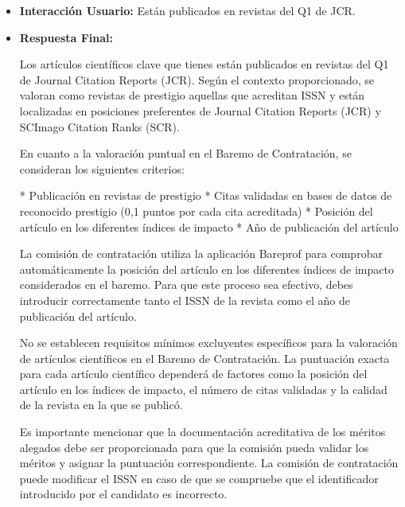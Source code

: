 \documentclass{article}
\begin{document}
\begin{itemize}
\begin{itemize}
                \textbf{Nota importante:}
                * La comisión de contratación puede modificar el ISSN en caso de que se compruebe que el identificador introducido por el candidato es incorrecto.
                * La documentación acreditativa de los méritos alegados debe ser proporcionada por el candidato para que la comisión pueda validar los méritos y asignar la puntuación correspondiente.
          \item \textbf{Interacción Usuario:} Están publicados en revistas del Q1 de JCR.
          \item \textbf{Respuesta Final:}

                Los artículos científicos clave que tienes están publicados en revistas del Q1 de Journal Citation Reports (JCR). Según el contexto proporcionado, se valoran como revistas de prestigio aquellas que acreditan ISSN y están localizadas en posiciones preferentes de Journal Citation Reports (JCR) y SCImago Citation Ranks (SCR).

                En cuanto a la valoración puntual en el Baremo de Contratación, se consideran los siguientes criterios:

                * Publicación en revistas de prestigio
                * Citas validadas en bases de datos de reconocido prestigio (0,1 puntos por cada cita acreditada)
                * Posición del artículo en los diferentes índices de impacto
                * Año de publicación del artículo

                La comisión de contratación utiliza la aplicación Bareprof para comprobar automáticamente la posición del artículo en los diferentes índices de impacto considerados en el baremo. Para que este proceso sea efectivo, debes introducir correctamente tanto el ISSN de la revista como el año de publicación del artículo.

                No se establecen requisitos mínimos excluyentes específicos para la valoración de artículos científicos en el Baremo de Contratación. La puntuación exacta para cada artículo científico dependerá de factores como la posición del artículo en los índices de impacto, el número de citas validadas y la calidad de la revista en la que se publicó.

                Es importante mencionar que la documentación acreditativa de los méritos alegados debe ser proporcionada para que la comisión pueda validar los méritos y asignar la puntuación correspondiente. La comisión de contratación puede modificar el ISSN en caso de que se compruebe que el identificador introducido por el candidato es incorrecto.


\end{itemize}
\end{itemize}
\end{document}
